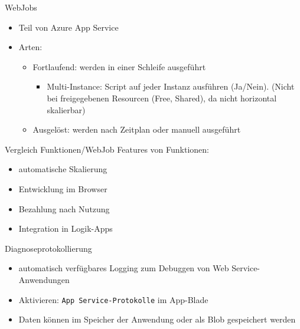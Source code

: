 \begin{flashcard}[Definition]{WebJobs}
    \begin{itemize}
        \item Teil von Azure App Service
        \item Arten:
            \begin{itemize}
                \item Fortlaufend: werden in einer Schleife ausgeführt
                \begin{itemize}
                    \item Multi-Instance: Script auf jeder Instanz ausführen (Ja/Nein).\newline
                        (Nicht bei freigegebenen Resourcen (Free, Shared), da nicht horizontal skalierbar)
                \end{itemize}
                \item Ausgelöst: werden nach Zeitplan oder manuell ausgeführt
            \end{itemize}
    \end{itemize}
\end{flashcard}

\begin{flashcard}[Definition]{Vergleich Funktionen/WebJob}
    Features von Funktionen:
    \begin{itemize}
        \item automatische Skalierung
        \item Entwicklung im Browser
        \item Bezahlung nach Nutzung
        \item Integration in Logik-Apps
    \end{itemize}
\end{flashcard}



\begin{flashcard}[Definition]{Diagnoseprotokollierung}
    \begin{itemize}
        \item automatisch verfügbares Logging zum Debuggen von Web Service-Anwendungen
        \item Aktivieren:\newline
            \texttt{App Service-Protokolle} im App-Blade
        \item Daten können im Speicher der Anwendung oder als Blob gespeichert werden
    \end{itemize}
\end{flashcard}

